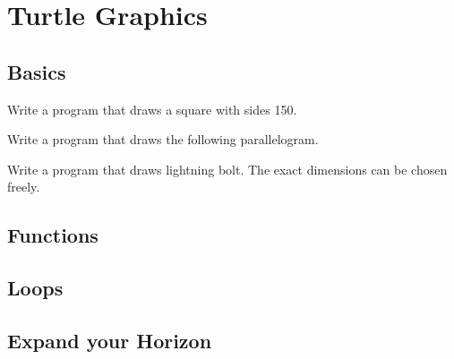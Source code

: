 \documentclass[11pt,a4paper]{report}
\begin{document}
\section{Turtle Graphics}

\subsection{Basics}

\begin{ex}
Write a program that draws a square with sides 150.
\end{ex}

\begin{ex}
Write a program that draws the following parallelogram.
\end{ex}

\begin{ex}
Write a program that draws lightning bolt. The exact  dimensions can be chosen freely.
\end{ex}

\subsection{Functions}

\subsection{Loops}

\subsection{Expand your Horizon}
\end{document}
